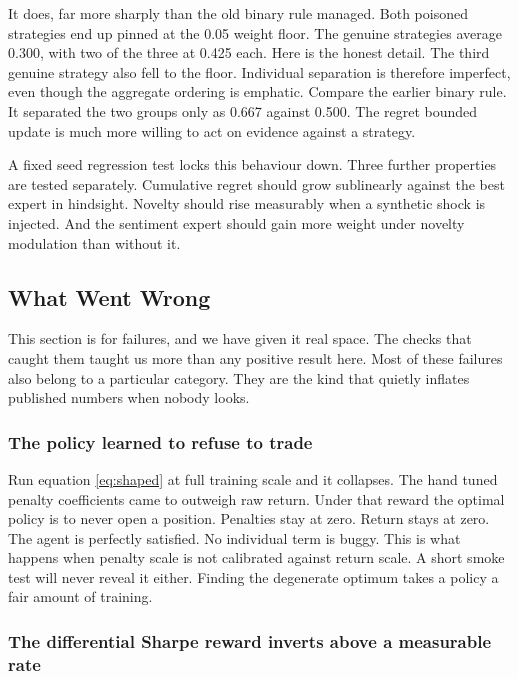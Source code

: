 \documentclass[conference]{IEEEtran}
\begin{document}
It does, far more sharply than the old binary rule managed. Both poisoned strategies end up pinned at the 0.05 weight floor. The genuine strategies average 0.300, with two of the three at 0.425 each. Here is the honest detail. The third genuine strategy also fell to the floor. Individual separation is therefore imperfect, even though the aggregate ordering is emphatic. Compare the earlier binary rule. It separated the two groups only as 0.667 against 0.500. The regret bounded update is much more willing to act on evidence against a strategy.

A fixed seed regression test locks this behaviour down. Three further properties are tested separately. Cumulative regret should grow sublinearly against the best expert in hindsight. Novelty should rise measurably when a synthetic shock is injected. And the sentiment expert should gain more weight under novelty modulation than without it.

\subsection{What Went Wrong}
\label{sec:negative}

This section is for failures, and we have given it real space. The checks that caught them taught us more than any positive result here. Most of these failures also belong to a particular category. They are the kind that quietly inflates published numbers when nobody looks.

\subsubsection{The policy learned to refuse to trade}

Run equation \ref{eq:shaped} at full training scale and it collapses. The hand tuned penalty coefficients came to outweigh raw return. Under that reward the optimal policy is to never open a position. Penalties stay at zero. Return stays at zero. The agent is perfectly satisfied. No individual term is buggy. This is what happens when penalty scale is not calibrated against return scale. A short smoke test will never reveal it either. Finding the degenerate optimum takes a policy a fair amount of training.

\subsubsection{The differential Sharpe reward inverts above a measurable rate}
\end{document}
